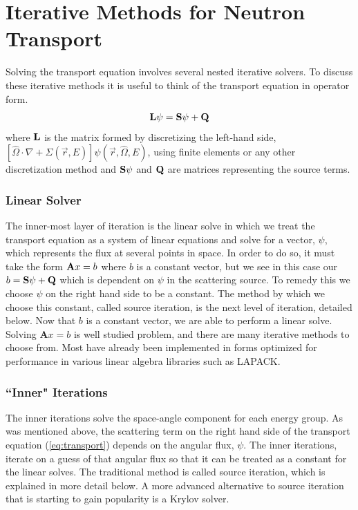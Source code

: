 
\section{Iterative Methods for Neutron Transport}
Solving the transport equation involves several nested iterative solvers. To discuss these iterative methods it is useful to think of the transport equation in operator form. 
\begin{equation}
    \bf{L}\psi = \bf{S}\psi + \bf{Q}
\end{equation}
where $\bf{L}$ is the matrix formed by discretizing the left-hand side, $[\hat{\Omega} \cdot \nabla + \Sigma(\vec{r}, E)]\psi(\vec{r}, \hat{\Omega}, E)$, using finite elements or any other discretization method and $\bf{S}\psi$ and $\bf{Q}$ are matrices representing the source terms. 

\subsubsection{Linear Solver}
The inner-most layer of iteration is the linear solve in which we treat the transport equation as a system of linear equations and solve for a vector, $\psi$, which represents the flux at several points in space. In order to do so, it must take the form ${\bf A} x = b$ where $b$ is a constant vector, but we see in this case our $b = {\bf S} \psi + {\bf Q}$ which is dependent on $\psi$ in the scattering source. To remedy this we choose $\psi$ on the right hand side to be a constant. The method by which we choose this constant, called source iteration, is the next level of iteration, detailed below. Now that $b$ is a constant vector, we are able to perform a linear solve. Solving $\textbf{A}x = b$ is well studied problem, and there are many iterative methods to choose from. Most have already been implemented in forms optimized for performance in various linear algebra libraries such as LAPACK.

\subsubsection{``Inner" Iterations}
The inner iterations solve the space-angle component for each energy group. As was mentioned above, the scattering term on the right hand side of the transport equation (\ref{eq:transport}) depends on the angular flux, $\psi$. The inner iterations, iterate on a guess of that angular flux so that it can be treated as a constant for the linear solves. The traditional method is called source iteration, which is explained in more detail below. A more advanced alternative to source iteration that is starting to gain popularity is a Krylov solver. 

